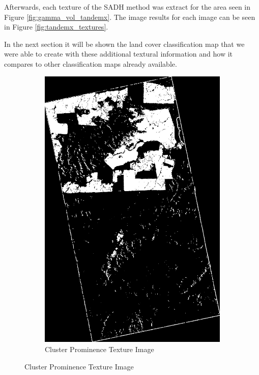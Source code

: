Afterwards, each texture of the SADH method was extract for the area seen in Figure \ref{fig:gamma_vol_tandemx}. The image results for each image can be seen in Figure \ref{fig:tandemx_textures}.

In the next section it will be shown the land cover classification map that we were able to create with these additional textural information and how it compares to other classification maps already available.
\begin{figure}
    \centering
    \begin{subfigure}[b]{0.4\linewidth}
      \includegraphics[width=\linewidth]{Cap3-Results/sum_and_diff_textures/cluster_prominenceimage.png}
       \caption{Cluster Prominence Texture Image}
    \end{subfigure}

\end{figure}
